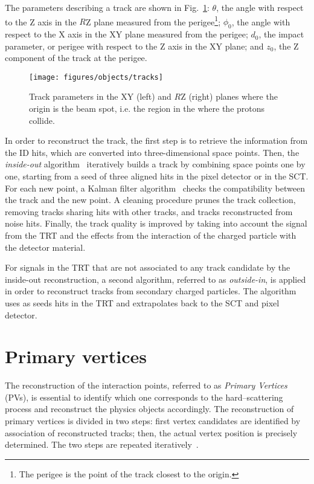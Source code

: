 The parameters describing a track are shown in
Fig.~\ref{fig:trackpar}: $\theta$, the angle with respect to the Z axis in the
$R$Z plane measured from the perigee\footnote{The perigee is the point
  of the track closest to the origin.}; $\phi_0$, the angle with
respect to the X axis in the XY plane measured from the perigee;
$d_0$, the impact parameter, or perigee with respect to the Z axis in
the XY plane; and $z_0$, the Z component of the track at the perigee. 

\begin{figure}[htb!]
  \centering
  \texttt{[image: figures/objects/tracks]}
  \caption{Track parameters in the XY (left) and $R$Z (right) planes
    where the origin is the beam spot, i.e. the region in the where
    the protons collide. 
    \label{fig:trackpar}}
\end{figure}

In order to reconstruct the track, the first step is to retrieve the
information from the ID hits, which are converted into
three-dimensional space points. Then, the {\it inside-out}
algorithm~\cite{insideoutalgo}  iteratively builds a track by
combining space points one by one, starting from a seed of three
aligned hits in the pixel detector or in the SCT. 
For each new point, a Kalman filter algorithm~\cite{kalmanfilter}
checks the compatibility between the track and the new point. 
A cleaning procedure prunes the track collection, removing 
tracks sharing hits with other tracks, and tracks reconstructed from
noise hits. 
Finally, the track quality is improved by taking into account the
signal from the TRT and the effects from the interaction of the
charged particle with the detector material. 

For signals in the TRT that are not associated to any track candidate
by the inside-out reconstruction, a second algorithm,
referred to as {\it outside-in}, is applied in order to
reconstruct tracks from secondary charged particles. 
The algorithm uses as seeds hits in the TRT
and extrapolates back to the SCT and pixel detector.

\section{Primary vertices}
\label{sec:pv}

The reconstruction of the interaction points, referred to as {\it Primary
  Vertices} (PVs), is essential to identify which one corresponds to
the hard--scattering process and reconstruct the physics
objects accordingly. The reconstruction of primary vertices is divided
in two steps: first vertex candidates are identified by association
of reconstructed tracks; then, the actual vertex position is precisely
determined. The two steps are repeated iteratively~\cite{vertexalgo}.


